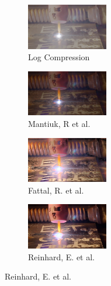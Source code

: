 \begin{figure}
\begin{subfigure}[b]{1.5in}
\centering
\includegraphics[width=1.4in]{ch2/diagrams/frames/5stops/log_5_stops.jpg}
\caption{Log Compression}
\label{fig:log_compress}
\end{subfigure}
\begin{subfigure}[b]{1.5in}
\centering
\includegraphics[width=1.4in]{ch2/diagrams/frames/5stops/untitled_pregamma_1_mantiuk06_contrast_mapping_0_1_saturation_factor_0_8_detail_factor_1.jpg}
\caption{Mantiuk, R et al. \cite{mantiuk2006perceptual}}
\label{fig:mantiuk}
\end{subfigure}
\begin{subfigure}[b]{1.5in}
\centering
\includegraphics[width=1.4in]{ch2/diagrams/frames/5stops/untitled_pregamma_1_fattal_alpha_0_25_beta_0_57_saturation_0_38_noiseredux_0_fftsolver_1.jpg}
\caption{Fattal, R. et al. \cite{fattal2002gradient}}
\label{fig:mouse}
\end{subfigure}
\begin{subfigure}[b]{1.5in}
\centering
\includegraphics[width=1.4in]{ch2/diagrams/frames/5stops/untitled_pregamma_1_reinhard02_key_0_07_phi_12_2_scales_range_4_lower1_upper90.jpg}
\caption{Reinhard, E. et al. \cite{reinhard2002photographic}}
\label{fig:mouse}
\end{subfigure}        


\end{figure}
